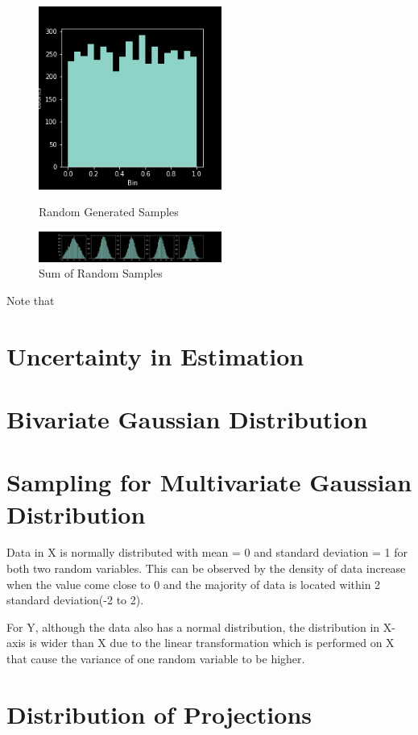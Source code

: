 \documentclass{article}
\begin{document}
\begin{figure}[H]
  \includegraphics[width=6cm]{random_numbers}
  \caption{Random Generated Samples}
\endminipage\hfill
{}
  \includegraphics[width=6cm]{sum_random_numbers}
  \caption{Sum of Random Samples}
\endminipage\hfill
\end{figure}

Note that 
\maketitle
\section{Uncertainty in Estimation}

\maketitle
\section{Bivariate Gaussian Distribution}

\maketitle
\section{Sampling for Multivariate Gaussian Distribution}
Data in X is normally distributed with mean = 0 and standard deviation = 1 for both two random variables. This can be observed by the density of data increase when the value come close to 0 and the majority of data is located within 2 standard deviation(-2 to 2).

For Y, although the data also has a normal distribution, the distribution in X-axis is wider than X due to the linear transformation which is performed on X that cause the variance of one random variable to be higher.

\maketitle
\section{Distribution of Projections}
\end{document}
